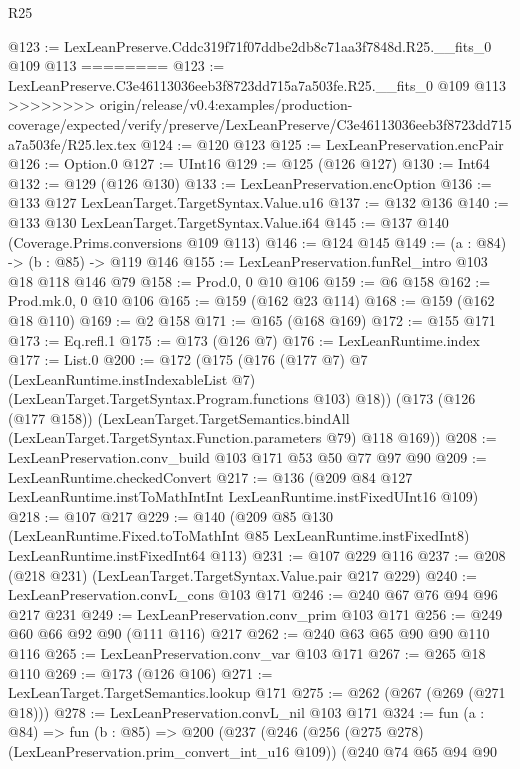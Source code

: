 \begin{lexlean}{R25}
\begin{coremodule}
{{{{{@123 := LexLeanPreserve.Cddc319f71f07ddbe2db8c71aa3f7848d.R25.__fits_0 @109 @113
========
@123 := LexLeanPreserve.C3e46113036eeb3f8723dd715a7a503fe.R25.__fits_0 @109 @113
>>>>>>>> origin/release/v0.4:examples/production-coverage/expected/verify/preserve/LexLeanPreserve/C3e46113036eeb3f8723dd715a7a503fe/R25.lex.tex
@124 := @120 @123
@125 := LexLeanPreservation.encPair
@126 := Option.{0}
@127 := UInt16
@129 := @125 (@126 @127)
@130 := Int64
@132 := @129 (@126 @130)
@133 := LexLeanPreservation.encOption
@136 := @133 @127 LexLeanTarget.TargetSyntax.Value.u16
@137 := @132 @136
@140 := @133 @130 LexLeanTarget.TargetSyntax.Value.i64
@145 := @137 @140 (Coverage.Prims.conversions @109 @113)
@146 := @124 @145
@149 := (a : @84) -> (b : @85) -> @119 @146
@155 := LexLeanPreservation.funRel_intro @103 @18 @118 @146 @79
@158 := Prod.{0, 0} @10 @106
@159 := @6 @158
@162 := Prod.mk.{0, 0} @10 @106
@165 := @159 (@162 @23 @114)
@168 := @159 (@162 @18 @110)
@169 := @2 @158
@171 := @165 (@168 @169)
@172 := @155 @171
@173 := Eq.refl.{1}
@175 := @173 (@126 @7)
@176 := LexLeanRuntime.index
@177 := List.{0}
@200 := @172
    (@175
      (@176
        (@177 @7)
        @7
        (LexLeanRuntime.instIndexableList @7)
        (LexLeanTarget.TargetSyntax.Program.functions @103)
        @18))
    (@173
      (@126 (@177 @158))
      (LexLeanTarget.TargetSemantics.bindAll
        (LexLeanTarget.TargetSyntax.Function.parameters @79)
        @118
        @169))
@208 := LexLeanPreservation.conv_build @103 @171 @53 @50 @77 @97 @90
@209 := LexLeanRuntime.checkedConvert
@217 := @136 (@209 @84 @127 LexLeanRuntime.instToMathIntInt LexLeanRuntime.instFixedUInt16 @109)
@218 := @107 @217
@229 := @140
    (@209
      @85
      @130
      (LexLeanRuntime.Fixed.toToMathInt @85 LexLeanRuntime.instFixedInt8)
      LexLeanRuntime.instFixedInt64
      @113)
@231 := @107 @229 @116
@237 := @208 (@218 @231) (LexLeanTarget.TargetSyntax.Value.pair @217 @229)
@240 := LexLeanPreservation.convL_cons @103 @171
@246 := @240 @67 @76 @94 @96 @217 @231
@249 := LexLeanPreservation.conv_prim @103 @171
@256 := @249 @60 @66 @92 @90 (@111 @116) @217
@262 := @240 @63 @65 @90 @90 @110 @116
@265 := LexLeanPreservation.conv_var @103 @171
@267 := @265 @18 @110
@269 := @173 (@126 @106)
@271 := LexLeanTarget.TargetSemantics.lookup @171
@275 := @262 (@267 (@269 (@271 @18)))
@278 := LexLeanPreservation.convL_nil @103 @171
@324 := fun (a : @84) =>
  fun (b : @85) =>
  @200
    (@237
      (@246
        (@256 (@275 @278) (LexLeanPreservation.prim_convert_int_u16 @109))
        (@240
          @74
          @65
          @94
          @90
}}}}}
\end{coremodule}
\end{lexlean}
